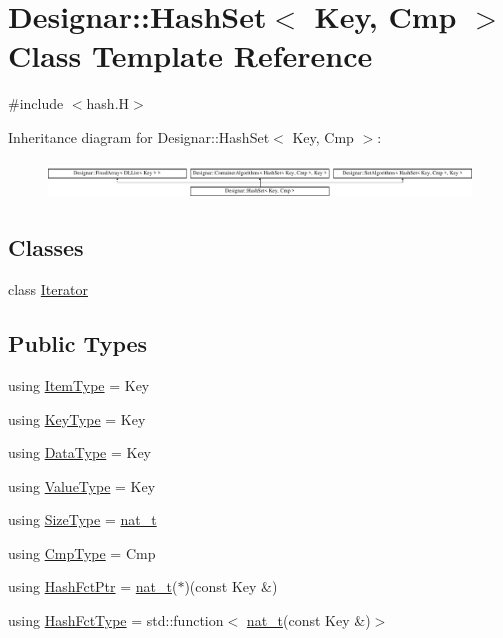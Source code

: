 \hypertarget{class_designar_1_1_hash_set}{}\section{Designar\+:\+:Hash\+Set$<$ Key, Cmp $>$ Class Template Reference}
\label{class_designar_1_1_hash_set}


{\ttfamily \#include $<$hash.\+H$>$}

Inheritance diagram for Designar\+:\+:Hash\+Set$<$ Key, Cmp $>$\+:\begin{figure}[H]
\begin{center}
\leavevmode
\includegraphics[height=1.000894cm]{class_designar_1_1_hash_set}
\end{center}
\end{figure}
\subsection*{Classes}
\begin{DoxyCompactItemize}
\item 
class \hyperlink{class_designar_1_1_hash_set_1_1_iterator}{Iterator}
\end{DoxyCompactItemize}
\subsection*{Public Types}
\begin{DoxyCompactItemize}
\item 
using \hyperlink{class_designar_1_1_hash_set_af1cb023a84bf6c6f17867f99bbc523c5}{Item\+Type} = Key
\item 
using \hyperlink{class_designar_1_1_hash_set_a4e23320d0b13915ce84186132ad4197a}{Key\+Type} = Key
\item 
using \hyperlink{class_designar_1_1_hash_set_af75f5917c5f53891a4129bd77d5d2906}{Data\+Type} = Key
\item 
using \hyperlink{class_designar_1_1_hash_set_a4edc6d161470bffb03dad2bbc916b6a0}{Value\+Type} = Key
\item 
using \hyperlink{class_designar_1_1_hash_set_a1bfcb16c2a94c0ab22e15f38b05ba8cc}{Size\+Type} = \hyperlink{namespace_designar_aa72662848b9f4815e7bf31a7cf3e33d1}{nat\+\_\+t}
\item 
using \hyperlink{class_designar_1_1_hash_set_ad0ab040392888a3320d2d72d1ead9968}{Cmp\+Type} = Cmp
\item 
using \hyperlink{class_designar_1_1_hash_set_a7a8b0a4970519ebc9ccc1ad247d0639f}{Hash\+Fct\+Ptr} = \hyperlink{namespace_designar_aa72662848b9f4815e7bf31a7cf3e33d1}{nat\+\_\+t}($\ast$)(const Key \&)
\item 
using \hyperlink{class_designar_1_1_hash_set_a05d8d111665c25bc17290c01fa299398}{Hash\+Fct\+Type} = std\+::function$<$ \hyperlink{namespace_designar_aa72662848b9f4815e7bf31a7cf3e33d1}{nat\+\_\+t}(const Key \&)$>$
\end{DoxyCompactItemize}
